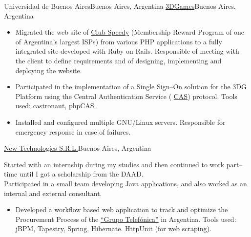 \documentclass[11pt,a4paper,sans]{moderncv}
\newcommand\weblink[2] {{\color{href} \href{#1}{#2}}}
\begin{document}
%
{Universidad de Buenos Aires}{Buenos Aires, Argentina}{}{%
}
%
{\weblink{http://www.3dgames.com.ar}{3DGames}}{Buenos Aires, Argentina}{}{%
\begin{itemize}
  \item Migrated the web site of \weblink{http://club.speedy.com.ar}{Club
    Speedy} (Membership Reward Program of one of Argentina's largest ISPs)
    from various PHP applications to a fully integrated site developed with
    Ruby on Rails. Responsible of meeting with the client to define
    requirements and of designing, implementing and deploying the website.
  \item Participated in the implementation of a Single Sign--On solution for
    the 3DG Platform using the Central Authentication Service
    (\weblink{http://en.wikipedia.org/wiki/Central_Authentication_Service}{CAS})
    protocol. Tools used:
    \weblink{https://github.com/relevance/castronaut}{castronaut},
    \weblink{https://wiki.jasig.org/display/CASC/phpCAS}{phpCAS}.
  \item Installed and configured multiple GNU/Linux servers. Responsible for
    emergency response in case of failures.
\end{itemize}
}
%
{\weblink{http://www.newtechnologies.com.ar}{New Technologies S.R.L.}}{Buenos
Aires, Argentina}{}{%
Started with an internship during my studies and then continued to work
part--time until I got a scholarship from the DAAD.\\
Participated in a small team developing Java applications, and also worked as
an internal and external consultant.
\begin{itemize}
  \item Developed a workflow based web application to track and optimize the
    Procurement Process of the \weblink{http://www.telefonica.com/}{``Grupo
    Telefónica''} in Argentina. Tools used: jBPM, Tapestry, Spring, Hibernate.
    HttpUnit (for web scraping).
\end{itemize}
}
\end{document}
